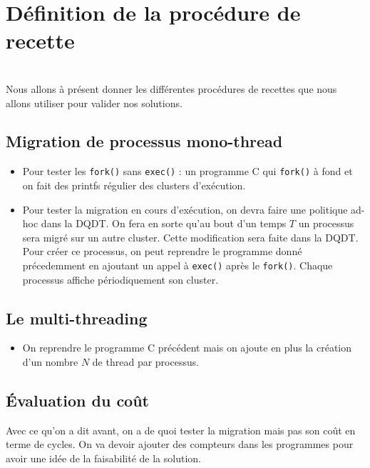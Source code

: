 \chapter{Définition de la procédure de recette}
\label{chap:tests}

  \\

  Nous allons à présent donner les différentes procédures de recettes que nous
  allons utiliser pour valider nos solutions.
  
  \section{Migration de processus mono-thread}

    \begin{itemize}
      \item Pour tester les \texttt{fork()} sans \texttt{exec()} : un programme
        C qui \texttt{fork()} à fond et on fait des printfs régulier des
        clusters d'exécution.
      \item Pour tester la migration en cours d'exécution, on devra faire une
        politique ad-hoc dans la DQDT. On fera en sorte qu'au bout d'un temps
        $T$ un processus sera migré sur un autre cluster. Cette modification
        sera faite dans la DQDT. Pour créer ce processus, on peut reprendre le
        programme donné précedemment en ajoutant un appel à \texttt{exec()}
        après le \texttt{fork()}. Chaque processus affiche périodiquement son
        cluster.
    \end{itemize}


  \section{Le multi-threading}

    \begin{itemize}
      \item On reprendre le programme C précédent mais on ajoute en plus la
        création d'un nombre $N$ de thread par processus.
    \end{itemize}


  \section{Évaluation du coût}

    Avec ce qu'on a dit avant, on a de quoi tester la migration mais pas son
    coût en terme de cycles. On va devoir ajouter des compteurs dans les
    programmes pour avoir une idée de la faisabilité de la solution.
